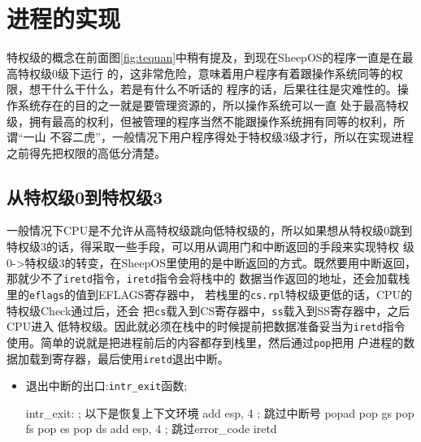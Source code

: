\section{进程的实现}
\label{sec:course}
特权级的概念在前面图\ref{fig:tequan}中稍有提及，到现在SheepOS的程序一直是在最高特权级0级下运行
的，这非常危险，意味着用户程序有着跟操作系统同等的权限，想干什么干什么，若是有什么不听话的
程序的话，后果往往是灾难性的。操作系统存在的目的之一就是要管理资源的，所以操作系统可以一直
处于最高特权级，拥有最高的权利，但被管理的程序当然不能跟操作系统拥有同等的权利，所谓“一山
不容二虎”，一般情况下用户程序得处于特权级3级才行，所以在实现进程之前得先把权限的高低分清楚。

\subsection{从特权级0到特权级3}

一般情况下CPU是不允许从高特权级跳向低特权级的，所以如果想从特权级0跳到
特权级3的话，得采取一些手段，可以用从调用门和中断返回的手段来实现特权
级0->特权级3的转变，在SheepOS里使用的是中断返回的方式。既然要用中断返回，
那就少不了\texttt{iretd}指令\cite{ws2013}，\texttt{iretd}指令会将栈中的
数据当作返回的地址，还会加载栈里的\texttt{eflags}的值到EFLAGS寄存器中，
若栈里的\texttt{cs.rpl}特权级更低的话，CPU的特权级Check通过后，还会
把\texttt{cs}载入到CS寄存器中，\texttt{ss}载入到SS寄存器中，之后CPU进入
低特权级。因此就必须在栈中的时候提前把数据准备妥当为\texttt{iretd}指令
使用。简单的说就是把进程前后的内容都存到栈里，然后通过\texttt{pop}把用
户进程的数据加载到寄存器，最后使用\texttt{iretd}退出中断。
\begin{itemize}
\item 退出中断的出口:\texttt{intr\_exit}函数;
\begin{codeblock}
\begin{nasmcode}
intr_exit:	     
; 以下是恢复上下文环境
   add esp, 4 ; 跳过中断号
   popad
   pop gs
   pop fs
   pop es
   pop ds
   add esp, 4 ; 跳过error_code
   iretd
\end{nasmcode}  
\end{codeblock}
\end{itemize}

